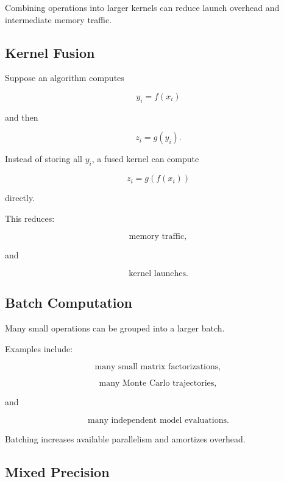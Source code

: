 Combining operations into larger kernels can reduce launch overhead and
intermediate memory traffic.

\subsection{Kernel Fusion}
\label{subsec:kernel-fusion}

Suppose an algorithm computes

\[
y_i=f(x_i)
\]

and then

\[
z_i=g(y_i).
\]

Instead of storing all \(y_i\), a fused kernel can compute

\[
\boxed{
z_i
=
g(f(x_i))
}
\]

directly.

This reduces:

\[
\boxed{
\text{memory traffic},
}
\]

and

\[
\boxed{
\text{kernel launches}.
}
\]

\subsection{Batch Computation}
\label{subsec:batch-computation}

Many small operations can be grouped into a larger batch.

Examples include:

\[
\boxed{
\text{many small matrix factorizations},
}
\]

\[
\boxed{
\text{many Monte Carlo trajectories},
}
\]

and

\[
\boxed{
\text{many independent model evaluations}.
}
\]

Batching increases available parallelism and amortizes overhead.

\subsection{Mixed Precision}
\label{subsec:hpmc-mixed-precision}

